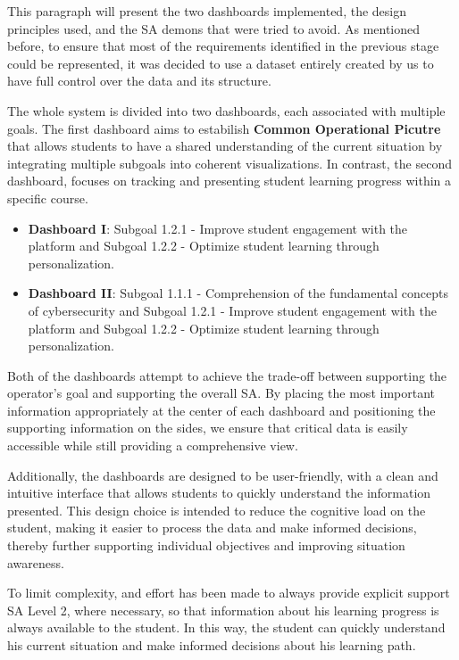 This paragraph will present the two dashboards implemented, the design principles used, and the SA demons that were tried to avoid. As mentioned before, to ensure that most of the requirements identified in the previous stage could be represented, it was decided to use a dataset entirely created by us to have full control over the data and its structure.

The whole system is divided into two dashboards, each associated with multiple goals. The first dashboard aims to estabilish \textbf{Common Operational Picutre} that allows students to have a shared understanding of the current situation by integrating multiple subgoals into coherent visualizations. 
In contrast, the second dashboard, focuses on tracking and presenting student learning progress within a specific course.

\begin{itemize}
    \item \textbf{Dashboard I}: Subgoal 1.2.1 - Improve student engagement with the platform and Subgoal 1.2.2 - Optimize student learning through personalization.
    \item \textbf{Dashboard II}: Subgoal 1.1.1 - Comprehension of the fundamental concepts of cybersecurity and Subgoal 1.2.1 - Improve student engagement with the platform and Subgoal 1.2.2 - Optimize student learning through personalization.
\end{itemize} 

Both of the dashboards attempt to achieve the trade-off between supporting the operator's goal and supporting the overall SA. By placing the most important information appropriately at the center of each dashboard and positioning the supporting information on the sides, we ensure that critical data is easily accessible while still providing a comprehensive view. 

Additionally, the dashboards are designed to be user-friendly, with a clean and intuitive interface that allows students to quickly understand the information presented. This design choice is intended to reduce the cognitive load on the student, making it easier to process the data and make informed decisions, thereby further supporting individual objectives and improving situation awareness.

To limit complexity, and effort has been made to always provide explicit support SA Level 2, where necessary, so that information about his learning progress is always available to the student. In this way, the student can quickly understand his current situation and make informed decisions about his learning path.



